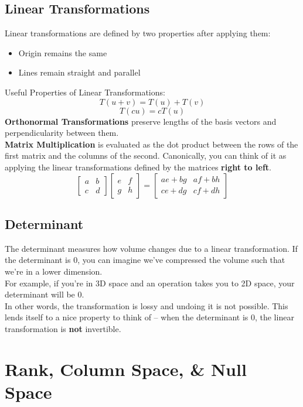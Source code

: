 \documentclass{article}
\begin{document}
\subsection{Linear Transformations}
Linear transformations are defined by two properties after applying them: \begin{itemize}
    \item Origin remains the same
    \item Lines remain straight and parallel
\end{itemize}
Useful Properties of Linear Transformations:
$$T(u + v) = T(u) + T(v)$$
$$T(cu) = cT(u)$$
\textbf{Orthonormal Transformations} preserve lengths of the basis vectors and perpendicularity between them. \\
\textbf{Matrix Multiplication} is evaluated as the dot product between the rows of the first matrix and the columns of the second. Canonically, you can think of it as applying the linear transformations defined by the matrices \textbf{right to left}.\\
$$\begin{bmatrix}
    a & b \\ c & d
\end{bmatrix}
\begin{bmatrix}
    e & f \\ g & h
\end{bmatrix} 
=
\begin{bmatrix}
    ae + bg & af + bh \\ ce + dg & cf + dh
\end{bmatrix}$$ 

\subsection{Determinant}
The determinant measures how volume changes due to a linear transformation. If the determinant is 0, you can imagine we've compressed the volume such that we're in a lower dimension. \\
For example, if you're in 3D space and an operation takes you to 2D space, your determinant will be 0.\\
In other words, the transformation is lossy and undoing it is not possible. This lends itself to a nice property to think of -- when the determinant is 0, the linear transformation is \textbf{not} invertible.

\section{Rank, Column Space, \& Null Space}
\end{document}

